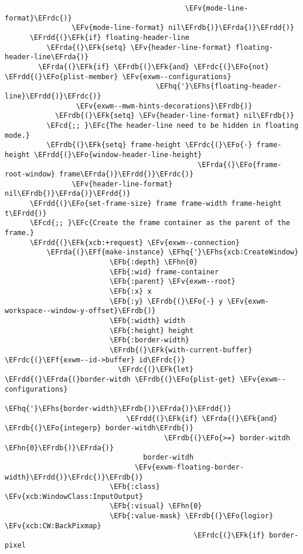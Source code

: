 \documentclass[a4wide,10pt]{article}
\newcommand{\EFc}[1]{\textcolor{EFc}{#1}} %
\newcommand{\EFcd}[1]{\textcolor{EFcd}{#1}} %
\newcommand{\EFk}[1]{\textcolor{EFk}{#1}} %
\newcommand{\EFb}[1]{\textcolor{EFb}{#1}} %
\newcommand{\EFf}[1]{\textcolor{EFf}{#1}} %
\newcommand{\EFv}[1]{\textcolor{EFv}{#1}} %
\newcommand{\EFo}[1]{\textcolor{EFo}{#1}} %
\newcommand{\EFhn}[1]{\textcolor{EFhn}{\textbf{#1}}} %
\newcommand{\EFhq}[1]{\textcolor{EFhq}{#1}} %
\newcommand{\EFhs}[1]{\textcolor{EFhs}{#1}} %
\newcommand{\EFrda}[1]{\textcolor{EFrda}{#1}} %
\newcommand{\EFrdb}[1]{\textcolor{EFrdb}{#1}} %
\newcommand{\EFrdc}[1]{\textcolor{EFrdc}{#1}} %
\newcommand{\EFrdd}[1]{\textcolor{EFrdd}{#1}} %
\begin{document}
\begin{Code}
\begin{Verbatim}
                                           \EFv{mode-line-format}\EFrdc{)}
                \EFv{mode-line-format} nil\EFrdb{)}\EFrda{)}\EFrdd{)}
      \EFrdd{(}\EFk{if} floating-header-line
          \EFrda{(}\EFk{setq} \EFv{header-line-format} floating-header-line\EFrda{)}
        \EFrda{(}\EFk{if} \EFrdb{(}\EFk{and} \EFrdc{(}\EFo{not} \EFrdd{(}\EFo{plist-member} \EFv{exwm--configurations}
                                    \EFhq{'}\EFhs{floating-header-line}\EFrdd{)}\EFrdc{)}
                 \EFv{exwm--mwm-hints-decorations}\EFrdb{)}
            \EFrdb{(}\EFk{setq} \EFv{header-line-format} nil\EFrdb{)}
          \EFcd{;; }\EFc{The header-line need to be hidden in floating mode.}
          \EFrdb{(}\EFk{setq} frame-height \EFrdc{(}\EFo{-} frame-height \EFrdd{(}\EFo{window-header-line-height}
                                              \EFrda{(}\EFo{frame-root-window} frame\EFrda{)}\EFrdd{)}\EFrdc{)}
                \EFv{header-line-format} nil\EFrdb{)}\EFrda{)}\EFrdd{)}
      \EFrdd{(}\EFo{set-frame-size} frame frame-width frame-height t\EFrdd{)}
      \EFcd{;; }\EFc{Create the frame container as the parent of the frame.}
      \EFrdd{(}\EFk{xcb:+request} \EFv{exwm--connection}
          \EFrda{(}\EFf{make-instance} \EFhq{'}\EFhs{xcb:CreateWindow}
                         \EFb{:depth} \EFhn{0}
                         \EFb{:wid} frame-container
                         \EFb{:parent} \EFv{exwm--root}
                         \EFb{:x} x
                         \EFb{:y} \EFrdb{(}\EFo{-} y \EFv{exwm-workspace--window-y-offset}\EFrdb{)}
                         \EFb{:width} width
                         \EFb{:height} height
                         \EFb{:border-width}
                         \EFrdb{(}\EFk{with-current-buffer} \EFrdc{(}\EFf{exwm--id->buffer} id\EFrdc{)}
                           \EFrdc{(}\EFk{let} \EFrdd{(}\EFrda{(}border-witdh \EFrdb{(}\EFo{plist-get} \EFv{exwm--configurations}
                                                          \EFhq{'}\EFhs{border-width}\EFrdb{)}\EFrda{)}\EFrdd{)}
                             \EFrdd{(}\EFk{if} \EFrda{(}\EFk{and} \EFrdb{(}\EFo{integerp} border-witdh\EFrdb{)}
                                      \EFrdb{(}\EFo{>=} border-witdh \EFhn{0}\EFrdb{)}\EFrda{)}
                                 border-witdh
                               \EFv{exwm-floating-border-width}\EFrdd{)}\EFrdc{)}\EFrdb{)}
                         \EFb{:class} \EFv{xcb:WindowClass:InputOutput}
                         \EFb{:visual} \EFhn{0}
                         \EFb{:value-mask} \EFrdb{(}\EFo{logior} \EFv{xcb:CW:BackPixmap}
                                             \EFrdc{(}\EFk{if} border-pixel

\end{Verbatim}
\end{Code}
\end{document}
